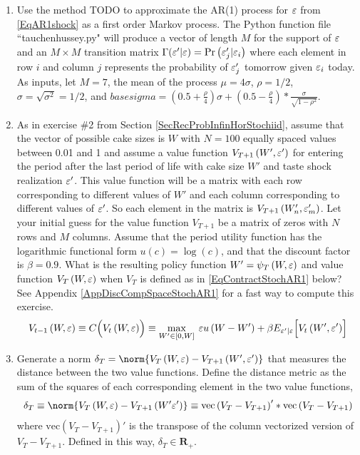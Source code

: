 \begin{enumerate}
   \item Use the method TODO to approximate the AR(1) process for $\varepsilon$ from \eqref{EqAR1shock} as a first order Markov process. The Python function file ``tauchenhussey.py" will produce a vector of length $M$ for the support of $\varepsilon$ and an $M\times M$ transition matrix $\Gamma(\varepsilon'|\varepsilon)=\text{Pr}\left(\varepsilon_j'|\varepsilon_i\right)$ where each element in row $i$ and column $j$ represents the probability of $\varepsilon_j'$ tomorrow given $\varepsilon_i$ today. As inputs, let $M=7$, the mean of the process $\mu=4\sigma$, $\rho = 1/2$, $\sigma=\sqrt{\sigma^2}=1/2$, and $basesigma=(0.5+\frac{\rho}{4})\sigma + (0.5 - \frac{\rho}{4})*\frac{\sigma}{\sqrt{1-\rho^2}}$.

   \item As in exercise \#2 from Section \ref{SecRecProbInfinHorStochiid}, assume that the vector of possible cake sizes is $W$ with $N=100$ equally spaced values between 0.01 and 1 and assume a value function $V_{T+1}\left(W',\varepsilon'\right)$ for entering the period after the last period of life with cake size $W'$ and taste shock realization $\varepsilon'$. This value function will be a matrix with each row corresponding to different values of $W'$ and each column corresponding to different values of $\varepsilon'$. So each element in the matrix is $V_{T+1}\left(W_n',\varepsilon_m'\right)$. Let your initial guess for the value function $V_{T+1}$ be a matrix of zeros with $N$ rows and $M$ columns. Assume that the period utility function has the logarithmic functional form $u(c)=\log(c)$, and that the discount factor is $\beta = 0.9$. What is the resulting policy function $W' = \psi_T\left(W,\varepsilon\right)$ and value function $V_T\left(W,\varepsilon\right)$ when $V_T$ is defined as in \eqref{EqContractStochAR1} below? See Appendix \ref{AppDiscCompSpaceStochAR1} for a fast way to compute this exercise.
   \begin{equation}\label{EqContractStochAR1}
      V_{t-1}\left(W,\varepsilon\right) \equiv C\Bigl(V_t\left(W,\varepsilon\right)\Bigr) \equiv \max_{W'\in[0,W]}\: \varepsilon u\left(W-W'\right) + \beta E_{\varepsilon'|\varepsilon}\Bigl[V_t\left(W',\varepsilon'\right)\Bigr]
   \end{equation}

   \item Generate a norm $\delta_T = \norm{V_T\left(W,\ve\right) - V_{T+1}\left(W',\ve'\right)}$ that measures the distance between the two value functions. Define the distance metric as the sum of the squares of each corresponding element in the two value functions,
   \begin{equation}\label{EqDistStochAR1}
      \delta_T \equiv \norm{V_T\left(W,\ve\right) - V_{T+1}\left(W'\ve'\right)} \equiv \text{vec}\left(V_T-V_{T+1}\right)'*\text{vec}\left(V_T-V_{T+1}\right)
   \end{equation}
   where $\text{vec}\left(V_T-V_{T+1}\right)'$ is the transpose of the column vectorized version of $V_T-V_{T+1}$. Defined in this way, $\delta_T\in\mathbf{R}_+$.


\end{enumerate}

